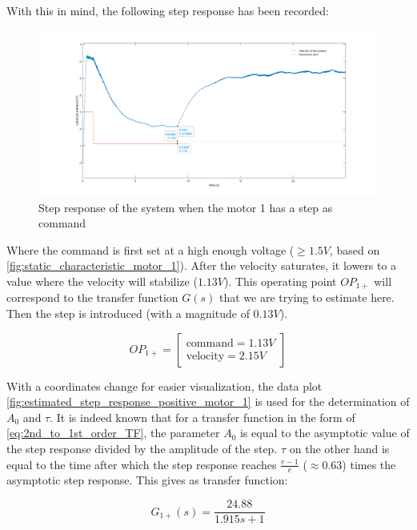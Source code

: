 With this in mind, the following step response has been recorded:

\begin{figure}[H]
    \centering
    \includegraphics[width=\textwidth]{Pictures/step_response_positive_motor_1.png}
    \caption{Step response of the system when the motor 1 has a step as command}
    \label{fig:step_response_positive_motor_1}
\end{figure}

Where the command is first set at a high enough voltage ($\geq 1.5 V$, based on \ref{fig:static_characteristic_motor_1}). 
After the velocity saturates, it lowers to a value where the velocity will stabilize ($1.13 V$). This operating point 
\textit{$OP_{1+}$} will correspond to the transfer function $G(s)$ that we are trying to estimate here. Then the step is
introduced (with a magnitude of $0.13 V$).

\begin{equation}
    OP_{1+} = \begin{bmatrix}
        \text{command} = 1.13 V \\
        \text{velocity} = 2.15 V
    \end{bmatrix}
\end{equation}

With a coordinates change for easier visualization, the data plot \ref{fig:estimated_step_response_positive_motor_1} is 
used for the determination of $A_0$ and $\tau$. It is indeed known that for a transfer function in the form of 
\ref{eq:2nd_to_1st_order_TF}, the parameter $A_0$ is equal to the asymptotic value of the step response divided by the amplitude 
of the step. $\tau$ on the other hand is equal to the time after which the step response reaches $\frac{e-1}{e}$ ($\approx 0.63$)
times the asymptotic step response. This gives as transfer function:

\begin{equation}
    G_{1+}(s) = \frac{24.88}{1.915s + 1}
    \label{eq:TF_mot1_+}
\end{equation}

